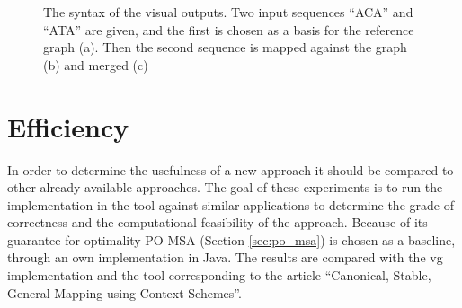 \documentclass[thesis.tex]{subfiles}
\begin{document}
\begin{figure}[b]
\begin{mdframed}
\begin{subfigure}[b]{0.32\textwidth}
\begin{mdframed}
\begin{center}
        \end{center}
      \end{mdframed}
      \caption{}
    \end{subfigure}
    \begin{subfigure}[b]{0.32\textwidth}
      \begin{mdframed}
        \begin{center}
        \end{center}
      \end{mdframed}
      \caption{}
    \end{subfigure}
  \end{mdframed}
  \caption{The syntax of the visual outputs. Two input sequences ``ACA'' and ``ATA'' are given, and the first is chosen as a basis for the reference graph (a). Then the second sequence is mapped against the graph (b) and merged (c)}
  \label{fig:visual_output}
\end{figure}
\clearpage
\section{Efficiency}
In order to determine the usefulness of a new approach it should be compared to other already available approaches. The goal of these experiments is to run the implementation in the tool against similar applications to determine the grade of correctness and the computational feasibility of the approach. Because of its guarantee for optimality PO-MSA (Section \ref{sec:po_msa}) is chosen as a baseline, through an own implementation in Java. The results are compared with the vg implementation\cite{vg} and the tool corresponding to the article ``Canonical, Stable, General Mapping using Context Schemes''\cite{sequence_graphs}.
\end{document}
